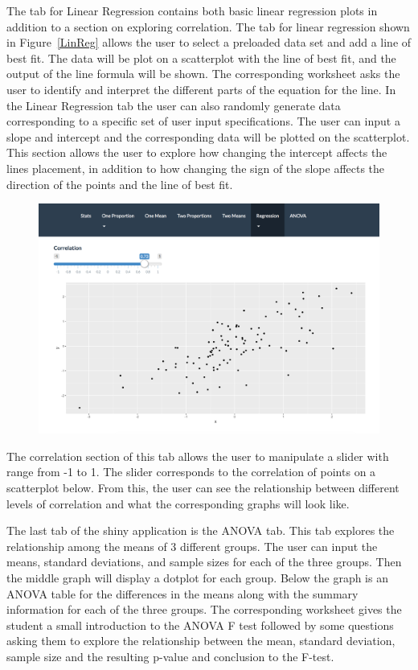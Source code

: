 \documentclass[11pt]{book}
\begin{document}
The tab for Linear Regression contains both basic linear regression plots in addition to a section on exploring correlation.  The tab for linear regression shown in Figure~\ref{LinReg} allows the user to select a preloaded data set and add a line of best fit.  The data will be plot on a scatterplot with the line of best fit, and the output of the line formula will be shown.  The corresponding worksheet asks the user to identify and interpret the different parts of the equation for the line.  In the Linear Regression tab the user can also randomly generate data corresponding to a specific set of user input specifications.  The user can input a slope and intercept and the corresponding data will be plotted on the scatterplot.  This section allows the user to explore how changing the intercept affects the lines placement, in addition to how changing the sign of the slope affects the direction of the points and the line of best fit.  

\begin{figure}
\centering
        \includegraphics[width=\textwidth]{Correlation.png}
\end{figure}




The correlation section of this tab allows the user to manipulate a slider with range from -1 to 1.  The slider corresponds to the correlation of points on a scatterplot below.  From this, the user can see the relationship between different levels of correlation and what the corresponding graphs will look like.  



The last tab of the shiny application is the ANOVA tab.  This tab explores the relationship among the means of 3 different groups.  The user can input the means, standard deviations, and sample sizes for each of the three groups.  Then the middle graph will display a dotplot for each group.  Below the graph is an ANOVA table for the differences in the means along with the summary information for each of the three groups.  The corresponding worksheet gives the student a small introduction to the ANOVA F test followed by some questions asking them to explore the relationship between the mean, standard deviation, sample size and the resulting p-value and conclusion to the F-test. 
\end{document}
